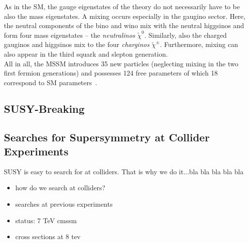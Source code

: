 As in the SM, the gauge eigenstates of the theory do not necessarily have to be also the mass eigenstates. A mixing occurs especially in the gaugino sector. Here, the neutral components of the bino and wino mix with the neutral higgsinos and form four mass eigenstates -- the \textit{neutralinos} $\tilde{\chi}^0$. Similarly, also the charged gauginos and higgsinos mix to the four \textit{charginos} $\tilde{\chi}^{\pm}$. Furthermore, mixing can also appear in the third squark and slepton generation. \\
All in all, the MSSM introduces 35 new particles (neglecting mixing in the two first fermion generations) and possesses 124 free parameters of which 18 correspond to SM parameters~\cite{bib:PDG:2012}. 
\subsection{SUSY-Breaking}
\label{subsec:susy_breaking}

\subsection{Searches for Supersymmetry at Collider Experiments}
\label{subsec:susy_status}
SUSY is easy to search for at colliders. That is why we do it...bla bla bla bla bla

\begin{itemize}
\item how do we search at colliders?
\item searches at previous experiments
\item status: 7 TeV cmssm
\item cross sections at 8 tev
\end{itemize}
